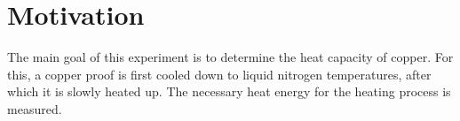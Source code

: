 \section{Motivation}
\label{sec:ziel}
The main goal of this experiment is to determine the heat capacity of copper.
For this, a copper proof is first cooled down to liquid nitrogen temperatures, after which it is slowly heated up.
The necessary heat energy for the heating process is measured.